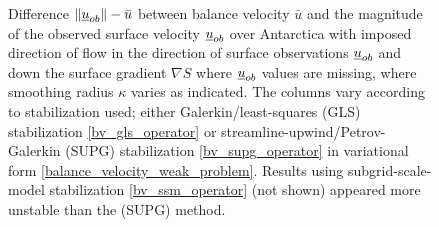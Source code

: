 \begin{figure}
  \caption[Antarctica balance-velocity misfit with $\mathbf{d}^{\text{data}} = -\nabla S$ where $\mathbf{u}_{ob}$ are missing.]{Difference $\Vert \underline{u}_{ob} \Vert - \bar{u}$ between balance velocity $\bar{u}$ and the magnitude of the observed surface velocity $\underline{u}_{ob}$ over Antarctica with imposed direction of flow in the direction of surface observations $\underline{u}_{ob}$ and down the surface gradient $\nabla S$ where $\underline{u}_{ob}$ values are missing, where smoothing radius $\kappa$ varies as indicated.  The columns vary according to stabilization used; either Galerkin/least-squares (GLS) stabilization \cref{bv_gls_operator} or streamline-upwind/Petrov-Galerkin (SUPG) stabilization \cref{bv_supg_operator} in variational form \cref{balance_velocity_weak_problem}.  Results using subgrid-scale-model stabilization \cref{bv_ssm_operator} (not shown) appeared more unstable than the (SUPG) method.}

  \label{antarctica_bv_image_gS_m_U_misfit}

\end{figure}
